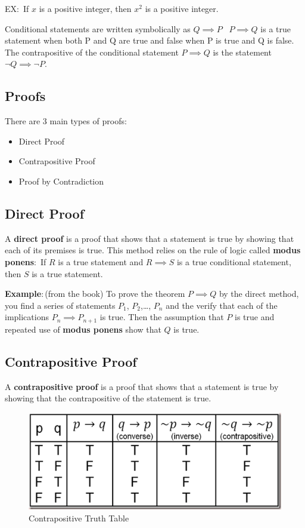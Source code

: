 \documentclass{article}
\begin{document}
EX$\colon$ If $x$ is a positive integer, then $x^2$ is a positive integer.


Conditional statements are written symbolically as $Q \implies P$ 
\
$P \implies Q$ is a true statement when both P and Q are
true and false when P is true and Q is false. 
The contrapositive of the conditional statement $P \implies Q$ is the statement $\lnot Q \implies \lnot P$. 
\subsection*{Proofs}

There are 3 main types of proofs:
\begin{itemize}
    \item Direct Proof
    \item Contrapositive Proof
    \item Proof by Contradiction
\end{itemize}

\subsection*{Direct Proof}
A \textbf{direct proof} is a proof that shows that a statement is true by showing that each of its premises is true.
This method relies on the rule of logic called 
\textbf{modus ponens$\colon$} If $R$ is a true statement and $R \implies S $ is a true conditional
statement, then $S$ is a true statement.


\textbf{Example$\colon$}(from the book) To prove the theorem $ P \implies Q$ by the direct
method, you find a series of statements $P_1$, $P_2$,\ldots, $P_n$ 
and the verify that each of the implications $P_n\implies P_{n+1}$ is true.
Then
the assumption that $P$ is true and repeated use of \textbf{modus ponens} show that $Q$ is true.

\subsection*{Contrapositive Proof}
A \textbf{contrapositive proof} is a proof that shows that a statement is true by showing that the contrapositive of the statement is true.
\begin{figure}[h]
    \centering
    \includegraphics[scale=0.5]{contrapositive.png}
    \caption{Contrapositive Truth Table}\label{fig:contrapositive truth table}
\end{figure}
\end{document}
